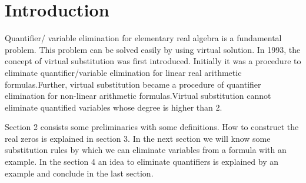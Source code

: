 \section{Introduction}
\label{sec:introduction}
Quantifier/ variable elimination for elementary real algebra is a fundamental problem. This problem can be solved easily by using virtual solution. In 1993, the concept of virtual substitution was first introduced. Initially it was a procedure to eliminate quantifier/variable elimination for linear real arithmetic formulas.Further, virtual substitution became a procedure of quantifier elimination for non-linear arithmetic formulas.Virtual substitution cannot eliminate quantified variables whose degree is higher than 2.

Section 2 consists some preliminaries with some definitions. How to construct the real zeros is explained in section 3. In the next section we will know some substitution rules by which we can eliminate variables from a formula with an example. In the section 4 an idea to eliminate quantifiers is explained by an example and conclude in the last section.
